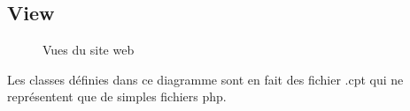 \subsection{View}

\begin{figure}[H]
	\begin{center}\end{center}
	\caption{Vues du site web}
\end{figure}

Les classes définies dans ce diagramme sont en fait des fichier .cpt qui ne représentent que de simples fichiers php.
